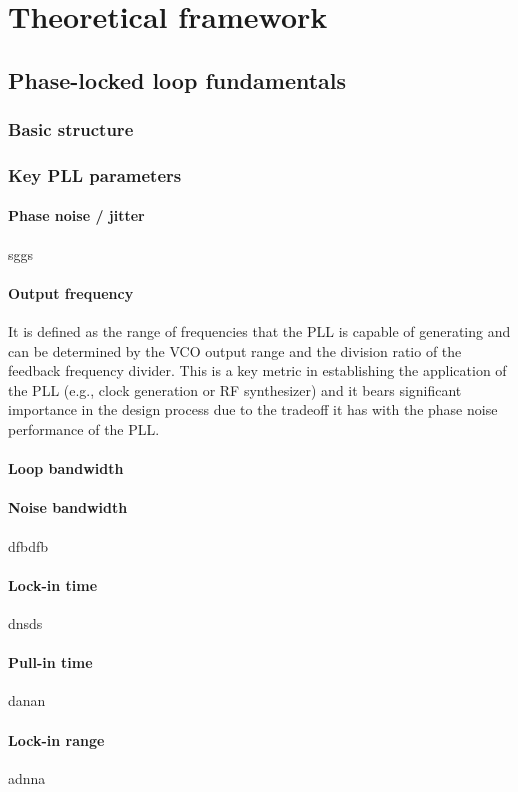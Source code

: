 \chapter{Theoretical framework}

\section{Phase-locked loop fundamentals}
\subsection{Basic structure}
\subsection{Key PLL parameters}
\subsubsection{Phase noise / jitter}
sggs
\subsubsection{Output frequency}
It is defined as the range of frequencies that the PLL is capable of generating and can be determined by the VCO output range and the division ratio of the feedback frequency divider. This
is a key metric in establishing the application of the PLL (e.g., clock generation or RF synthesizer) and it bears significant importance in the design process due to the tradeoff 
it has with the phase noise performance of the PLL.
\subsubsection{Loop bandwidth}
\subsubsection{Noise bandwidth}
dfbdfb
\subsubsection{Lock-in time}
dnsds
\subsubsection{Pull-in time}
danan
\subsubsection{Lock-in range}
adnna
